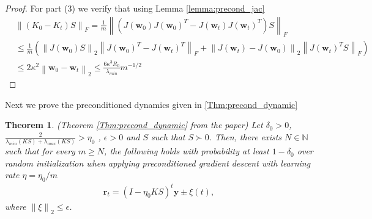 \documentclass[10pt]{article} %
\theoremstyle{plain}
\newtheorem{theorem}{Theorem}[section]
\theoremstyle{definition}
\theoremstyle{remark}
\newcommand{\norm}[1]{\left\lVert#1\right\rVert}
\newcommand{\y}{\mathbf{y}}
\newcommand{\res}{\mathbf{r}}
\newcommand{\w}{\mathbf{w}}
\begin{document}
\begin{proof}
For part (3) we verify that using Lemma \ref{lemma:precond_jac}
\begin{align}\label{eq:prec_proof_transition}
    &\norm{(K_0-K_t)S}_F=\frac{1}{m}\norm{(J(\w_0)J(\w_0)^T-J(\w_t)J(\w_t)^T)S}_F\\
    &\leq \frac{1}{m}\left(\norm{J(\w_0)S}_{2}\norm{J(\w_0)^T-J(\w_t)^T}_F
    +\norm{J(\w_t)-J(\w_0)}_{2}\norm{J(\w_t)^TS}_F\right)\\
    &\leq 2\kappa^2\norm{\w_0-\w_t}_2\leq \frac{6\kappa^3R_0}{ \lambda_{min}}{m^{-1/2}}
\end{align}
\end{proof}
Next we prove the preconditioned dynamics given in \ref{Thm:precond_dynamic}
\begin{theorem}(Theorem \ref{Thm:precond_dynamic} from the paper) %
Let $\delta_0 > 0$, $\frac{2}{\lambda_{min}(KS)+\lambda_{max}(KS)}>\eta_0 $ , $\epsilon>0$ and $S$ such that $S\succ 0$. Then, there
exists $N \in  \mathbb{N}$ such that for every $m \geq N$, the following holds with probability at
least $1-\delta_0$ over random initialization when applying preconditioned gradient descent with learning rate $\eta=\eta_0/m$ 
\begin{align*}
    \res_t=(I-\eta_0 K S)^t \y \pm \xi(t), 
\end{align*}
where $\norm{\xi}_2\leq \epsilon$. 
\end{theorem}
\end{document}
